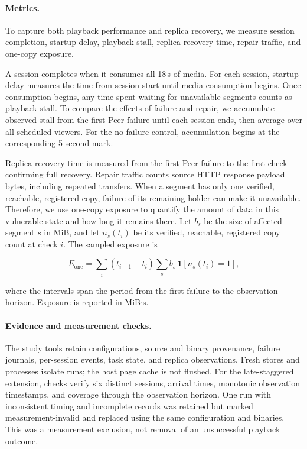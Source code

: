 \paragraph{Metrics.}
To capture both playback performance and replica recovery, 
we measure session completion, startup delay, playback stall, replica recovery time, repair traffic, and one-copy exposure.

A session completes when it consumes all 18\,s of media.
For each session, startup delay measures the time from session start until media consumption begins. 
Once consumption begins, any time spent waiting for unavailable segments counts as playback stall.
To compare the effects of failure and repair, 
we accumulate observed stall from the first Peer failure until each session ends, 
then average over all scheduled viewers. 
For the no-failure control, accumulation begins at the corresponding 5-second mark.

Replica recovery time is measured from the first Peer failure
to the first check confirming full recovery.
Repair traffic counts source HTTP response payload bytes,
including repeated transfers.
When a segment has only one verified, reachable, registered copy,
failure of its remaining holder can make it unavailable.
Therefore, we use one-copy exposure to quantify the amount of data in this vulnerable
state and how long it remains there.
Let $b_s$ be the size of affected segment $s$ in MiB,
and let $n_s(t_i)$ be its verified, reachable, registered copy count
at check $i$.
The sampled exposure is

\begin{equation}
  E_{\mathrm{one}}
  = \sum_i (t_{i+1}-t_i)
    \sum_s b_s\,\mathbf{1}[n_s(t_i)=1],
\end{equation}

where the intervals span the period from the first failure
to the observation horizon.
Exposure is reported in MiB$\cdot$s.

\paragraph{Evidence and measurement checks.}
The study tools retain configurations, source and binary provenance,
failure journals, per-session events, task state, and replica observations.
Fresh stores and processes isolate runs; the host page cache is not flushed.
For the late-staggered extension, checks verify six distinct sessions,
arrival times, monotonic observation timestamps, and coverage through the
observation horizon. One run with inconsistent timing and incomplete
records was retained but marked measurement-invalid and replaced using
the same configuration and binaries. This was a measurement exclusion,
not removal of an unsuccessful playback outcome.

